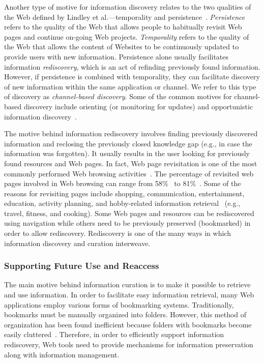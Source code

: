 \documentclass{sigchi}
\begin{document}
{{Another type of motive for information discovery relates to the two qualities of the Web defined by Lindley et al.---temporality and persistence~\cite{lindley2012s}. \textit{Persistence} refers to the quality of the Web that allows people to habitually revisit Web pages and continue on-going Web projects. \textit{Temporality} refers to the quality of the Web that allows the content of Websites to be continuously updated to provide users with new information. Persistence alone usually facilitates information \textit{rediscovery}, which is an act of refinding previously found information. However, if persistence is combined with temporality, they can facilitate discovery of new information within the same application or channel. We refer to this type of discovery as \textit{channel-based discovery}. Some of the common motives for channel-based discovery include orienting (or monitoring for updates) and opportunistic information discovery~\cite{lindley2012s}.          

The motive behind information rediscovery involves finding previously discovered information and reclosing the previously closed knowledge gap (e.g., in case the information was forgotten). It usually results in the user looking for previously found resources and Web pages. In fact, Web page revisitation is one of the most commonly performed Web browsing activities~\cite{adar2008large,cockburn2003improving}. The percentage of revisited web pages involved in Web browsing can range from 58\%~\cite{tauscher1997people} to 81\%~\cite{cockburn2001web}. Some of the reasons for revisiting pages include shopping, communication, entertainment, education, activity planning, and hobby-related information retrieval~\cite{adar2008large} (e.g., travel, fitness, and cooking). Some Web pages and resources can be rediscovered using navigation while others need to be previously preserved (bookmarked) in order to allow rediscovery. Rediscovery is one of the many ways in which information discovery and curation interweave. 
}

{\subsubsection{Supporting Future Use and Reaccess}
The main motive behind information curation is to make it possible to retrieve and use information. In order to facilitate easy information retrieval, many Web applications employ various forms of bookmarking systems. Traditionally, bookmarks must be manually organized into folders. However, this method of organization has been found inefficient because folders with bookmarks become easily cluttered~\cite{abrams1998information}. Therefore, in order to efficiently support information rediscovery, Web tools need to provide mechanisms for information preservation along with information management.
}

}
\end{document}
